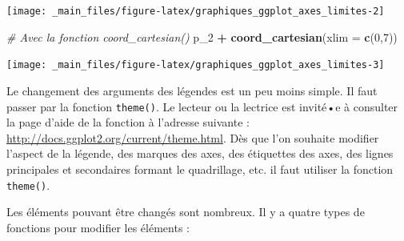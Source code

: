\documentclass[
  11pt,
]{book}
\newenvironment{Shaded}{\begin{snugshade}}{\end{snugshade}}
\newcommand{\CommentTok}[1]{\textcolor[rgb]{0.56,0.35,0.01}{\textit{#1}}}
\newcommand{\DataTypeTok}[1]{\textcolor[rgb]{0.13,0.29,0.53}{#1}}
\newcommand{\DecValTok}[1]{\textcolor[rgb]{0.00,0.00,0.81}{#1}}
\newcommand{\KeywordTok}[1]{\textcolor[rgb]{0.13,0.29,0.53}{\textbf{#1}}}
\newcommand{\NormalTok}[1]{#1}
\newcommand{\OperatorTok}[1]{\textcolor[rgb]{0.81,0.36,0.00}{\textbf{#1}}}
\newcommand{\StringTok}[1]{\textcolor[rgb]{0.31,0.60,0.02}{#1}}
\numberwithin{equation}{section}
\numberwithin{countremarque}{section}
\begin{document}
\begin{center}\texttt{[image: \_main\_files/figure-latex/graphiques\_ggplot\_axes\_limites-2]} \end{center}

\begin{Shaded}
\begin{Highlighting}[]
\CommentTok{\# Avec la fonction coord\_cartesian()}
\NormalTok{p\_}\DecValTok{2} \OperatorTok{+}\StringTok{ }\KeywordTok{coord\_cartesian}\NormalTok{(}\DataTypeTok{xlim =} \KeywordTok{c}\NormalTok{(}\DecValTok{0}\NormalTok{,}\DecValTok{7}\NormalTok{))}
\end{Highlighting}
\end{Shaded}

\begin{center}\texttt{[image: \_main\_files/figure-latex/graphiques\_ggplot\_axes\_limites-3]} \end{center}

Le changement des arguments des légendes est un peu moins simple. Il faut passer par la fonction \texttt{theme()}. Le lecteur ou la lectrice est invité•e à consulter la page d'aide de la fonction à l'adresse suivante : \url{http://docs.ggplot2.org/current/theme.html}. Dès que l'on souhaite modifier l'aspect de la légende, des marques des axes, des étiquettes des axes, des lignes principales et secondaires formant le quadrillage, etc. il faut utiliser la fonction \texttt{theme()}.

Les éléments pouvant être changés sont nombreux. Il y a quatre types de fonctions pour modifier les éléments :
\end{document}
